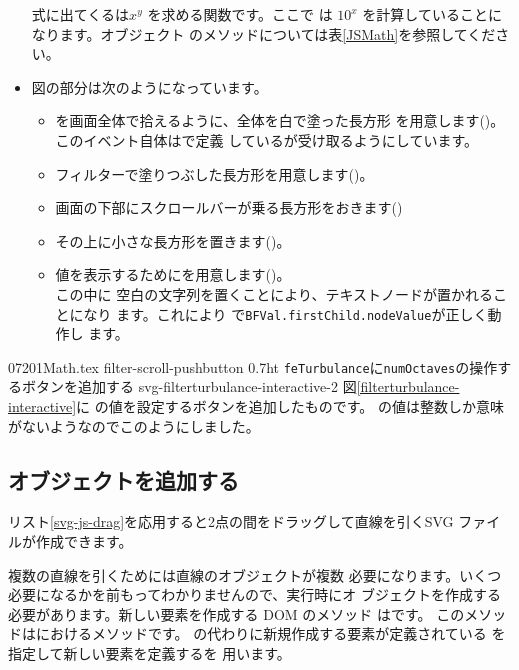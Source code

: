 \begin{itemize}
       式に出てくるは$x^y$ を求める関数です。ここで
       は $10^{x}$ を計算していることになります。オブジェクト
       のメソッドについては表\ref{JSMath}を参照してください。
 \item 図の部分は次のようになっています。
\begin{itemize}
 \item {}を画面全体で拾えるように、全体を白で塗った長方形
       を用意します()。このイベント自体はで定義
       しているが受け取るようにしています。
 \item フィルターで塗りつぶした長方形を用意します()。
 \item 画面の下部にスクロールバーが乗る長方形をおきます()
 \item その上に小さな長方形を置きます()。
 \item 値を表示するためにを用意します()。\\
       この中に
       空白の文字列を置くことにより、テキストノードが置かれることになり
       ます。これにより
       で\texttt{BFVal.firstChild.nodeValue}が正しく動作し
       ます。
\end{itemize}
\end{itemize}
 \CH07201Math.tex
\ProbwithFigSol%
{filter-scroll-pushbutton}
{0.7}{ht}
{\texttt{feTurbulance}に\texttt{numOctaves}の操作するボタンを追加する}
{svg-filterturbulance-interactive-2}
{図\ref{filterturbulance-interactive}に
の値を設定するボタンを追加したものです。
の値は整数しか意味がないようなのでこのようにしました。
}
\fi
\subsection{オブジェクトを追加する}
リスト\ref{svg-js-drag}を応用すると2点の間をドラッグして直線を引くSVG
ファイルが作成できます。

複数の直線を引くためには直線のオブジェクトが複数
必要になります。いくつ必要になるかを前もってわかりませんので、実行時にオ
ブジェクトを作成する必要があります。新しい要素を作成する DOM のメソッド
はです。
このメソッドはにおけるメソッドです。
の代わりに新規作成する要素が定義されている
を指定して新しい要素を定義するを
用います。

